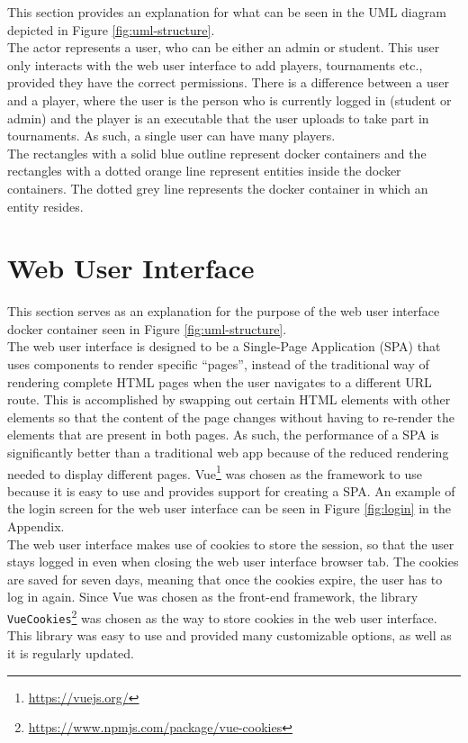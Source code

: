 \documentclass[a4paper, 11pt]{report}
\begin{document}
This section provides an explanation for what can be seen in the UML diagram
depicted in Figure \ref{fig:uml-structure}. \\

The actor represents a user, who can be either an admin or student. This user
only interacts with the web user interface to add players, tournaments etc.,
provided they have the correct permissions. There is a difference between a
user and a player, where the user is the person who is currently logged in
(student or admin) and the player is an executable that the user uploads to take
part in tournaments. As such, a single user can have many players. \\

The rectangles with a solid blue outline represent docker containers and the
rectangles with a dotted orange line represent entities inside the docker
containers. The dotted grey line represents the docker container in which an
entity resides.

\section{Web User Interface}
\label{sec:impl-web-interface}

This section serves as an explanation for the purpose of the web user interface
docker container seen in Figure \ref{fig:uml-structure}. \\

The web user interface is designed to be a Single-Page Application (SPA) that
uses components to render specific ``pages'', instead of the traditional way of
rendering complete HTML pages when the user navigates to a different URL route.
This is accomplished by swapping out certain HTML elements with other elements
so that the content of the page changes without having to re-render the elements
that are present in both pages. As such, the performance of a SPA is significantly
better than a traditional web app because of the reduced rendering needed to
display different pages. Vue\footnote{\url{https://vuejs.org/}} was chosen as the
framework to use because it is easy to use and provides support for creating a
SPA. An example of the login screen for the web user interface can be seen in
Figure \ref{fig:login} in the Appendix. \\

The web user interface makes use of cookies to store the session, so that the
user stays logged in even when closing the web user interface browser tab. The
cookies are saved for seven days, meaning that once the cookies expire, the
user has to log in again. Since Vue was chosen as the front-end framework, the
library \texttt{VueCookies}\footnote{\url{https://www.npmjs.com/package/vue-cookies}}
was chosen as the way to store cookies in the web user interface. This library
was easy to use and provided many customizable options, as well as it is
regularly updated. \\
\end{document}
